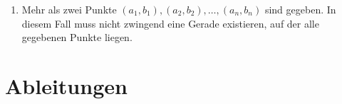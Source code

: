 \begin{problem}
\begin{enumerate}
        \item Mehr als zwei Punkte \((a_1, b_1), (a_2, b_2), \dots, (a_n, b_n)\) sind gegeben. In diesem Fall muss nicht zwingend eine Gerade existieren, auf der alle gegebenen Punkte liegen. \par
        \begin{normalfont}
            
        \end{normalfont}
    \end{enumerate}
\end{problem}

\section{Ableitungen}
